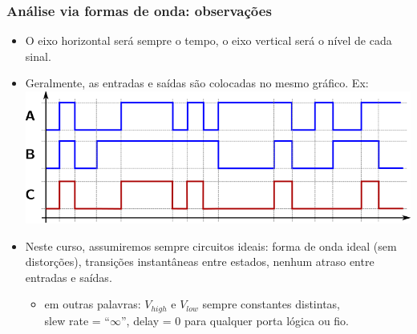 \documentclass{beamer}
\begin{document}

\begin{frame}
\frametitle{Análise via formas de onda: observações}

\begin{itemize}
\item O eixo horizontal será sempre o tempo, o eixo vertical será o nível de cada sinal.
\pause
\item Geralmente, as entradas e saídas são colocadas no mesmo gráfico. Ex:\\
\includegraphics{images/waveform4}
\pause
\item Neste curso, assumiremos sempre circuitos ideais: forma de onda
ideal (sem distorções), transições instantâneas entre estados, nenhum
atraso entre entradas e saídas.
\begin{itemize}
\item em outras palavras: $V_{high}$ e $V_{low}$ sempre constantes distintas,\\
slew rate = ``$\infty$'', delay = 0 para qualquer porta lógica ou fio.
\end{itemize}
\end{itemize}

\end{frame}

\end{document}
